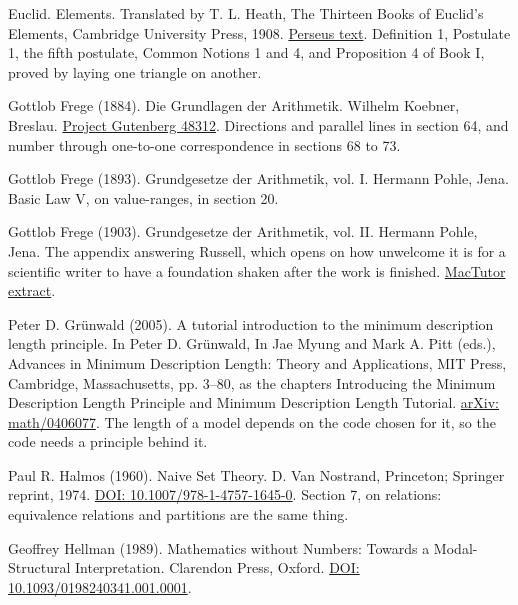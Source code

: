 \documentclass[11pt,twoside]{article}
\theoremstyle{thielethm}
\theoremstyle{thieledef}
\theoremstyle{thieledef}
\theoremstyle{thieledef}
\theoremstyle{thielethm}
\theoremstyle{thieleobs}
\theoremstyle{thielethm}
\begin{document}
\noindent Euclid. Elements. Translated by T. L. Heath, The Thirteen Books of Euclid's Elements, Cambridge University Press, 1908. \href{http://www.perseus.tufts.edu/hopper/text?doc=Perseus:text:1999.01.0086}{Perseus text}. Definition 1, Postulate 1, the fifth postulate, Common Notions 1 and 4, and Proposition 4 of Book I, proved by laying one triangle on another.
\par\medskip

\noindent Gottlob Frege (1884). Die Grundlagen der Arithmetik. Wilhelm Koebner, Breslau. \href{https://www.gutenberg.org/ebooks/48312}{Project Gutenberg 48312}. Directions and parallel lines in section 64, and number through one-to-one correspondence in sections 68 to 73.
\par\medskip

\noindent Gottlob Frege (1893). Grundgesetze der Arithmetik, vol. I. Hermann Pohle, Jena. Basic Law V, on value-ranges, in section 20.
\par\medskip

\noindent Gottlob Frege (1903). Grundgesetze der Arithmetik, vol. II. Hermann Pohle, Jena. The appendix answering Russell, which opens on how unwelcome it is for a scientific writer to have a foundation shaken after the work is finished. \href{https://mathshistory.st-andrews.ac.uk/Bookpages/Frege10.html}{MacTutor extract}.
\par\medskip

\noindent Peter D. Gr\"unwald (2005). A tutorial introduction to the minimum description length principle. In Peter D. Gr\"unwald, In Jae Myung and Mark A. Pitt (eds.), Advances in Minimum Description Length: Theory and Applications, MIT Press, Cambridge, Massachusetts, pp. 3--80, as the chapters Introducing the Minimum Description Length Principle and Minimum Description Length Tutorial. \href{https://arxiv.org/abs/math/0406077}{arXiv: math/0406077}. The length of a model depends on the code chosen for it, so the code needs a principle behind it.
\par\medskip

\noindent Paul R. Halmos (1960). Naive Set Theory. D. Van Nostrand, Princeton; Springer reprint, 1974. \href{https://doi.org/10.1007/978-1-4757-1645-0}{DOI: 10.1007/978-1-4757-1645-0}. Section 7, on relations: equivalence relations and partitions are the same thing.
\par\medskip

\noindent Geoffrey Hellman (1989). Mathematics without Numbers: Towards a Modal-Structural Interpretation. Clarendon Press, Oxford. \href{https://doi.org/10.1093/0198240341.001.0001}{DOI: 10.1093/0198240341.001.0001}.
\par\medskip
\end{document}
